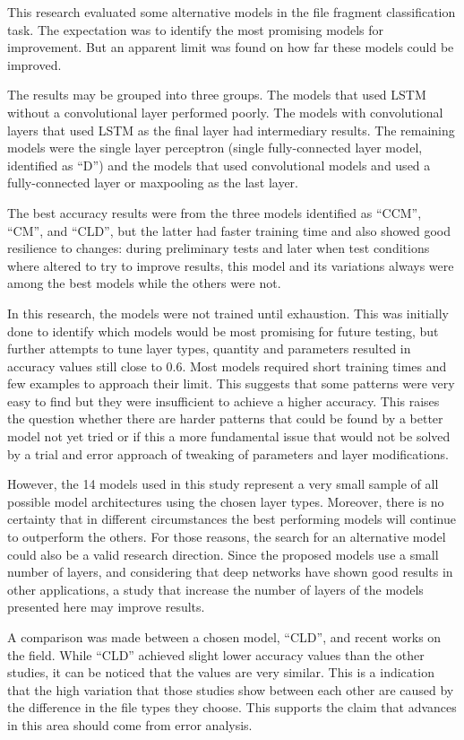 This research evaluated some alternative models in the file fragment classification task. The expectation was to identify the most promising models for improvement. But an apparent limit was found on how far these models could be improved.

The results may be grouped into three groups. The models that used LSTM without a convolutional layer performed poorly. The models with convolutional layers that used LSTM as the final layer had intermediary results. The remaining models were the single layer perceptron (single fully-connected layer model, identified as ``D'') and the models that used convolutional models and used a fully-connected layer or maxpooling as the last layer.

The best accuracy results were from the three models identified as ``CCM'', ``CM'', and ``CLD'', but the latter had faster training time and also showed good resilience to changes: during preliminary tests and later when test conditions where altered to try to improve results, this model and its variations always were among the best models while the others were not.

In this research, the models were not trained until exhaustion.
This was initially done to identify which models would be most promising for future testing, but further attempts to tune layer types, quantity and parameters resulted in accuracy values still close to 0.6.
Most models required short training times and few examples to approach their limit.
This suggests that some patterns were very easy to find but they were insufficient to achieve a higher accuracy.
This raises the question whether there are harder patterns that could be found by a better model not yet tried or if this a more fundamental issue that would not be solved by a trial and error approach of tweaking of parameters and layer modifications.


However, the 14 models used in this study represent a very small sample of all possible model architectures using the chosen layer types. Moreover, there is no certainty that in different circumstances the best performing models will continue to outperform the others. For those reasons, the search for an alternative model could also be a valid research direction. Since the proposed models use a small number of layers, and considering that deep networks have shown good results in other applications, a study that increase the number of layers of the models presented here may improve results.

A comparison was made between a chosen model, ``CLD'', and recent works on the field. While ``CLD'' achieved slight lower accuracy values than the other studies, it can be noticed that the values are very similar. This is a indication that the high  variation that those studies show between each other are caused by the difference in the file types they choose. This supports the claim that advances in this area should come from error analysis.

